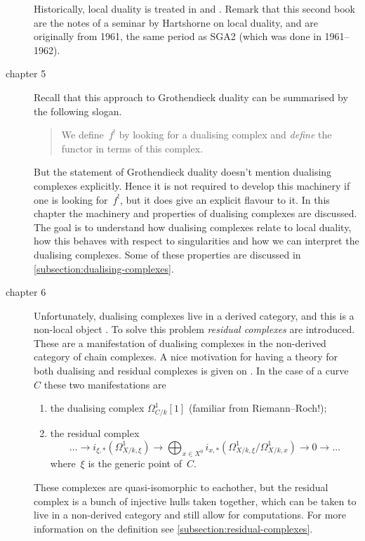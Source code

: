\documentclass[10pt,a4paper]{article}
\begin{document}
\begin{description}
    Historically, local duality is treated in \cite{sga2} and \cite{hartshorne-local-cohomology}. Remark that this second book are the notes of a seminar by Hartshorne on local duality, and are originally from 1961, the same period as SGA2 (which was done in 1961--1962).

  \item[chapter 5] Recall that this approach to Grothendieck duality can be summarised by the following slogan.
    \begin{quote}
      We define~$f^!$ by looking for a dualising complex and \emph{define} the functor in terms of this complex.
    \end{quote}
    But the statement of Grothendieck duality doesn't mention dualising complexes explicitly. Hence it is not required to develop this machinery if one is looking for~$f^!$, but it does give an explicit flavour to it. In this chapter the machinery and properties of dualising complexes are discussed. The goal is to understand how dualising complexes relate to local duality, how this behaves with respect to singularities and how we can interpret the dualising complexes. Some of these properties are discussed in \cref{subsection:dualising-complexes}.

  \item[chapter 6] Unfortunately, dualising complexes live in a derived category, and this is a non-local object \cite[page 193]{hartshorne-residues-and-duality}. To solve this problem \emph{residual complexes} are introduced. These are a manifestation of dualising complexes in the non-derived category of chain complexes. A nice motivation for having a theory for both dualising and residual complexes is given on \cite[pages 106--107]{conrad-grothendieck-duality-and-base-change}. In the case of a curve~$C$ these two manifestations are
    \begin{enumerate}
      \item the dualising complex $\Omega_{C/k}^1[1]$ (familiar from Riemann--Roch!);
      \item the residual complex
        \begin{equation}
          \dotso\to i_{\xi,*}\left( \Omega_{X/k,\xi}^1 \right)\to\bigoplus_{x\in X^0}i_{x,*}\left( \Omega_{X/k,\xi}^1/\Omega_{X/k,x}^1 \right)\to 0\to\dotso
        \end{equation}
        where~$\xi$ is the generic point of~$C$.
    \end{enumerate}
    These complexes are quasi-isomorphic to eachother, but the residual complex is a bunch of injective hulls taken together, which can be taken to live in a non-derived category and still allow for computations. For more information on the definition see \cref{subsection:residual-complexes}.


\end{description}
\end{document}
